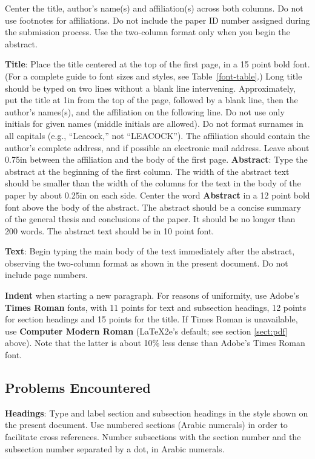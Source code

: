 \documentclass[11pt,letterpaper]{article}
\begin{document}
Center the title, author's name(s) and affiliation(s) across both
columns. Do not use footnotes for affiliations.  Do not include the
paper ID number assigned during the submission process. 
Use the two-column format only when you begin the abstract.

{\bf Title}: Place the title centered at the top of the first page, in
a 15 point bold font.  (For a complete guide to font sizes and styles, see Table~\ref{font-table}.)
Long title should be typed on two lines without
a blank line intervening. Approximately, put the title at 1in from the
top of the page, followed by a blank line, then the author's names(s),
and the affiliation on the following line.  Do not use only initials
for given names (middle initials are allowed). Do not format surnames
in all capitals (e.g., ``Leacock,'' not ``LEACOCK'').  The affiliation should
contain the author's complete address, and if possible an electronic
mail address. Leave about 0.75in between the affiliation and the body
of the first page.
{\bf Abstract}: Type the abstract at the beginning of the first
column.  The width of the abstract text should be smaller than the
width of the columns for the text in the body of the paper by about
0.25in on each side.  Center the word {\bf Abstract} in a 12 point
bold font above the body of the abstract. The abstract should be a
concise summary of the general thesis and conclusions of the paper.
It should be no longer than 200 words.  The abstract text should be in 10 point font.

{\bf Text}: Begin typing the main body of the text immediately after
the abstract, observing the two-column format as shown in 
the present document.  Do not include page numbers.

{\bf Indent} when starting a new paragraph. For reasons of uniformity,
use Adobe's {\bf Times Roman} fonts, with 11 points for text and 
subsection headings, 12 points for section headings and 15 points for
the title.  If Times Roman is unavailable, use {\bf Computer Modern
  Roman} (\LaTeX2e{}'s default; see section \ref{sect:pdf} above).
Note that the latter is about 10\% less dense than Adobe's Times Roman
font.

\subsection{Problems Encountered}

{\bf Headings}: Type and label section and subsection headings in the
style shown on the present document.  Use numbered sections (Arabic
numerals) in order to facilitate cross references. Number subsections
with the section number and the subsection number separated by a dot,
in Arabic numerals. 
\end{document}
